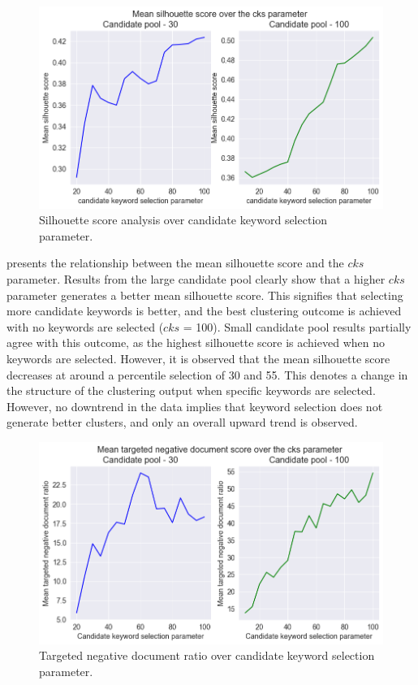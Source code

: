 \begin{figure}[h]
	\centering
	\includegraphics[width=.99\textwidth]{images/subplots/csk_sil_score_subplot.png}
	\caption[Silhouette score analysis over cks parameter.]{Silhouette score analysis over candidate keyword selection parameter. \label{fig:silhouette_score_vs_csk}}
\end{figure}  

  presents the relationship between the mean silhouette score and the $cks$ parameter. Results from the large candidate pool clearly show that a higher $cks$ parameter generates a better mean silhouette score. This signifies that selecting more candidate keywords is better, and the best clustering outcome is achieved with no keywords are selected ($cks$ = 100). Small candidate pool results partially agree with this outcome, as the highest silhouette score is achieved when no keywords are selected. However, it is observed that the mean silhouette score decreases at around a percentile selection of 30 and 55. This denotes a change in the structure of the clustering output when specific keywords are selected. However, no downtrend in the data implies that keyword selection does not generate better clusters, and only an overall upward trend is observed.

\begin{figure}[h]
	\centering
	\includegraphics[width=.99\textwidth]{images/subplots/csk_tfn_score_subplot.png}
	\caption[Targeted negative document ratio over cks parameter.]{Targeted negative document ratio over candidate keyword selection parameter.  \label{fig:target_function_vs_csk}}
\end{figure}

